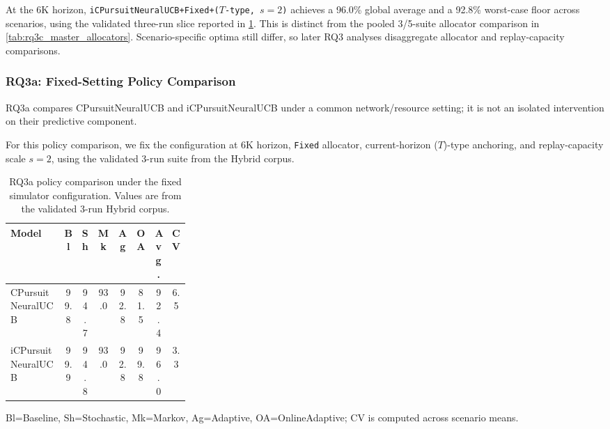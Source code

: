 At the 6K horizon, \texttt{iCPursuitNeuralUCB+Fixed+($T$-type, $s=2$)} achieves a 96.0\% global average and a 92.8\% worst-case floor across scenarios, using the validated three-run slice reported in \cref{tab:rq3a_master_informative}. This is distinct from the pooled 3/5-suite allocator comparison in \cref{tab:rq3c_master_allocators}. Scenario-specific optima still differ, so later RQ3 analyses disaggregate allocator and replay-capacity comparisons.

\subsubsection{RQ3a: Fixed-Setting Policy Comparison}
\label{subsubsec:rq3a_answer}

RQ3a compares CPursuitNeuralUCB and iCPursuitNeuralUCB under a common network/resource setting; it is not an isolated intervention on their predictive component.

For this policy comparison, we fix the configuration at 6K horizon, \texttt{Fixed} allocator, current-horizon ($T$)-type anchoring, and replay-capacity scale $s=2$, using the validated 3-run suite from the Hybrid corpus.

\begin{table}[ht!]
\footnotesize
\centering
\setlength{\tabcolsep}{3pt}
\caption{RQ3a policy comparison under the fixed simulator configuration. Values are from the validated 3-run Hybrid corpus.}
\label{tab:rq3a_master_informative}
\begin{tabular}{p{0.30\linewidth} c c c c c c c}
\toprule
\textbf{Model} & \textbf{Bl} & \textbf{Sh} & \textbf{Mk} & \textbf{Ag} & \textbf{OA} & \textbf{Avg.} & \textbf{CV} \\
\midrule
CPursuitNeuralUCB & 99.8 & 94.7 & 93.0 & 92.8 & 81.5 & 92.4 & 6.5 \\
iCPursuitNeuralUCB & 99.9 & 94.8 & 93.0 & 92.8 & 99.8 & 96.0 & 3.3 \\
\bottomrule
\end{tabular}

{\footnotesize Bl=Baseline, Sh=Stochastic, Mk=Markov, Ag=Adaptive, OA=OnlineAdaptive; CV is computed across scenario means.}
\end{table}

